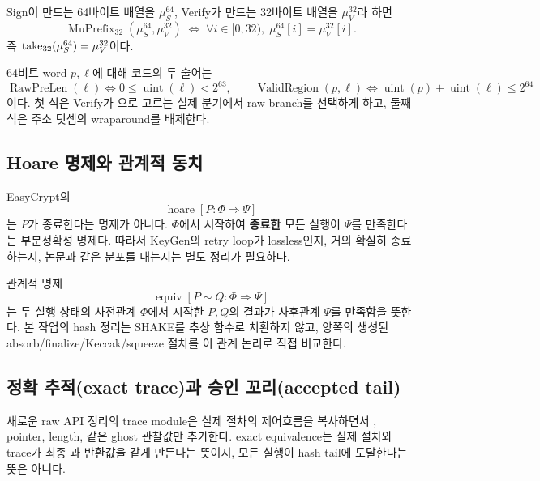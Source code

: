 \begin{definition}[\(\mu\) 접두부]
\label{def:mu-prefix}
Sign이 만드는 64바이트 배열을 \(\mu_S^{64}\), Verify가 만드는 32바이트
배열을 \(\mu_V^{32}\)라 하면
\[
  \operatorname{MuPrefix}_{32}(\mu_S^{64},\mu_V^{32})
  \;\Longleftrightarrow\;
  \forall i\in[0,32),\;\mu_S^{64}[i]=\mu_V^{32}[i].
\]
즉 \(\mathop{\mathrm{take}}_{32}(\mu_S^{64})=\mu_V^{32}\)이다.
\end{definition}

\begin{definition}
\label{def:raw-region}
64비트 word \(p,\ell\)에 대해 코드의 두 술어는
\[
  \operatorname{RawPreLen}(\ell)
    \Longleftrightarrow 0\le\operatorname{uint}(\ell)<2^{63},
  \qquad
  \operatorname{ValidRegion}(p,\ell)
    \Longleftrightarrow
    \operatorname{uint}(p)+\operatorname{uint}(\ell)\le 2^{64}
\]
이다. 첫 식은 Verify가 으로 고르는 실제 분기에서
raw branch를 선택하게 하고, 둘째 식은 주소 덧셈의 wraparound를 배제한다.
\end{definition}

\subsection{Hoare 명제와 관계적 동치}

EasyCrypt의
\[
  \operatorname{hoare}[P:\Phi\Longrightarrow\Psi]
\]
는 \(P\)가 종료한다는 명제가 아니다. \(\Phi\)에서 시작하여 \textbf{종료한}
모든 실행이 \(\Psi\)를 만족한다는 부분정확성 명제다. 따라서 KeyGen의 retry
loop가 lossless인지, 거의 확실히 종료하는지, 논문과 같은 분포를 내는지는 별도
정리가 필요하다.

관계적 명제
\[
  \operatorname{equiv}[P\sim Q:\Phi\Longrightarrow\Psi]
\]
는 두 실행 상태의 사전관계 \(\Phi\)에서 시작한 \(P,Q\)의 결과가 사후관계
\(\Psi\)를 만족함을 뜻한다. 본 작업의 hash 정리는 SHAKE를 추상 함수로
치환하지 않고, 양쪽의 생성된 absorb/finalize/Keccak/squeeze 절차를 이
관계 논리로 직접 비교한다.

\subsection{정확 추적(exact trace)과 승인 꼬리(accepted tail)}

새로운 raw API 정리의 trace module은 실제 절차의 제어흐름을 복사하면서
, pointer, length,  같은 ghost
관찰값만 추가한다. exact equivalence는 실제 절차와 trace가 최종
과 반환값을 같게 만든다는 뜻이지, 모든 실행이 hash
tail에 도달한다는 뜻은 아니다.

